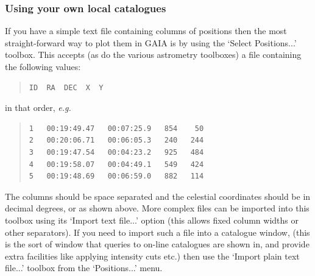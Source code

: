 \documentclass[twoside,11pt]{article}
\renewcommand{\_}{\texttt{\symbol{95}}}
\begin{document}
\subsubsection{Using your own local catalogues}
If you have a simple text file containing columns of positions then
the most straight-forward way to plot them in GAIA is by using the
`Select Positions...' toolbox. This accepts (as do the various
astrometry toolboxes) a file containing the following values:
\begin{quote}
\begin{verbatim}
ID  RA  DEC  X  Y
\end{verbatim}
\end{quote}
in that order, \textit{e.g.}
\begin{quote}
\begin{verbatim}
1   00:19:49.47   00:07:25.9   854    50
2   00:20:06.71   00:06:05.3   240   244
3   00:19:47.54   00:04:23.2   925   484
4   00:19:58.07   00:04:49.1   549   424
5   00:19:48.69   00:06:59.0   882   114
\end{verbatim}
\end{quote}
The columns should be space separated and the celestial coordinates
should be in decimal degrees, or as shown above. More complex files
can be imported into this toolbox using its `Import text file...'
option (this allows fixed column widths or other separators). If you
need to import such a file into a catalogue window, (this is the sort
of window that queries to on-line catalogues are shown in, and provide
extra facilities like applying intensity cuts etc.) then use the
`Import plain text file...' toolbox from the `Positions...' menu.
\end{document}
